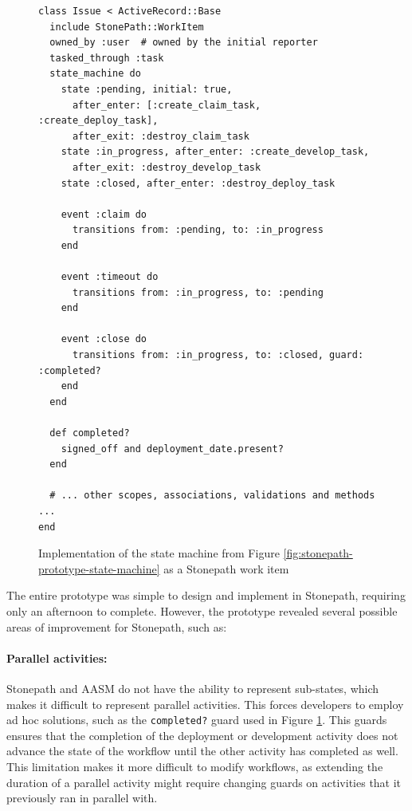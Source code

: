 \documentclass[document.tex]{subfiles}
\begin{document}
\begin{figure}[!ht]
  \begin{lstlisting}
class Issue < ActiveRecord::Base
  include StonePath::WorkItem
  owned_by :user  # owned by the initial reporter
  tasked_through :task
  state_machine do
    state :pending, initial: true,
      after_enter: [:create_claim_task, :create_deploy_task],
      after_exit: :destroy_claim_task
    state :in_progress, after_enter: :create_develop_task,
      after_exit: :destroy_develop_task
    state :closed, after_enter: :destroy_deploy_task

    event :claim do
      transitions from: :pending, to: :in_progress
    end

    event :timeout do
      transitions from: :in_progress, to: :pending
    end

    event :close do
      transitions from: :in_progress, to: :closed, guard: :completed?
    end
  end

  def completed?
    signed_off and deployment_date.present?
  end

  # ... other scopes, associations, validations and methods ...
end
  \end{lstlisting}
  \caption{Implementation of the state machine from Figure \ref{fig:stonepath-prototype-state-machine} as a Stonepath work item}
  \label{fig:stonepath-prototype-workitem}
\end{figure}

The entire prototype was simple to design and implement in Stonepath, requiring only an afternoon to complete. However, the prototype revealed several possible areas of improvement for Stonepath, such as:

\paragraph{Parallel activities:} Stonepath and AASM do not have the ability to represent sub-states, which makes it difficult to represent parallel activities. This forces developers to employ ad hoc solutions, such as the \verb!completed?! guard used in Figure \ref{fig:stonepath-prototype-workitem}. This guards ensures that the completion of the deployment or development activity does not advance the state of the workflow until the other activity has completed as well. This limitation makes it more difficult to modify workflows, as extending the duration of a parallel activity might require changing guards on activities that it previously ran in parallel with.
\end{document}
